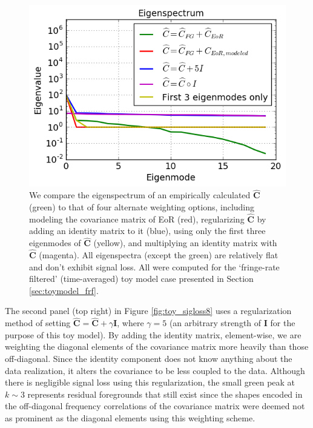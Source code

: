 \documentclass[preprint2,numberedappendix,tighten]{aastex6}  %
\begin{document}
\begin{figure}
	\centering
	\includegraphics[trim={0cm 0cm 0cm 0cm},clip,width=\columnwidth]{plots/toy_sigloss14.png}
	\caption{We compare the eigenspectrum of an empirically calculated $\widehat{\textbf{C}}$ (green) to that of four alternate 
weighting options, including modeling the covariance matrix of EoR (red), regularizing $\widehat{\textbf{C}}$ by adding an identity 
matrix to it (blue), using only the first three eigenmodes of $\widehat{\textbf{C}}$ (yellow), and multiplying an identity matrix with $
\widehat{\textbf{C}}$ (magenta). All eigenspectra (except the green) are relatively flat and don't exhibit signal loss. All were 
computed for the `fringe-rate filtered' (time-averaged) toy model case presented in Section \ref{sec:toymodel_frf}.}
	\label{fig:toy_sigloss14}
\end{figure}

The second panel (top right) in Figure \ref{fig:toy_sigloss8} uses a regularization method of setting $\widehat{\textbf{C}} = 
\widehat{\textbf{C}} + \gamma\textbf{I}$, where $\gamma = 5$ (an arbitrary strength 
of $\textbf{I}$ for the purpose of this toy model). By adding the identity matrix, element-wise, we are weighting the diagonal 
elements of the covariance matrix more heavily than those off-diagonal. Since the identity component does not know anything about the data realization, it alters the covariance to be less coupled to the data. Although there is negligible signal loss using this regularization, the small green peak at $k\sim3$ represents residual foregrounds that still exist since the shapes encoded in the off-diagonal frequency correlations of the covariance matrix were deemed not as prominent as the diagonal elements using this weighting scheme. 
\end{document}
